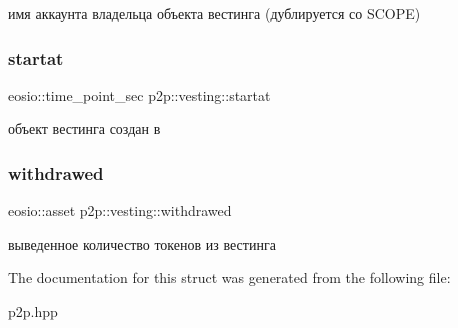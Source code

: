 имя аккаунта владельца объекта вестинга (дублируется со S\+C\+O\+PE) \mbox{\label{structp2p_1_1vesting_ac2a702d706aa9146588fffb6113d1c79}} 
\subsubsection{\texorpdfstring{startat}{startat}}
{\footnotesize\ttfamily eosio\+::time\+\_\+point\+\_\+sec p2p\+::vesting\+::startat}

объект вестинга создан в \mbox{\label{structp2p_1_1vesting_a88ce3db1c7e1d53750a8d6e864da8c6c}} 
\subsubsection{\texorpdfstring{withdrawed}{withdrawed}}
{\footnotesize\ttfamily eosio\+::asset p2p\+::vesting\+::withdrawed}

выведенное количество токенов из вестинга 

The documentation for this struct was generated from the following file\+:\begin{DoxyCompactItemize}
\item 
p2p.\+hpp\end{DoxyCompactItemize}
